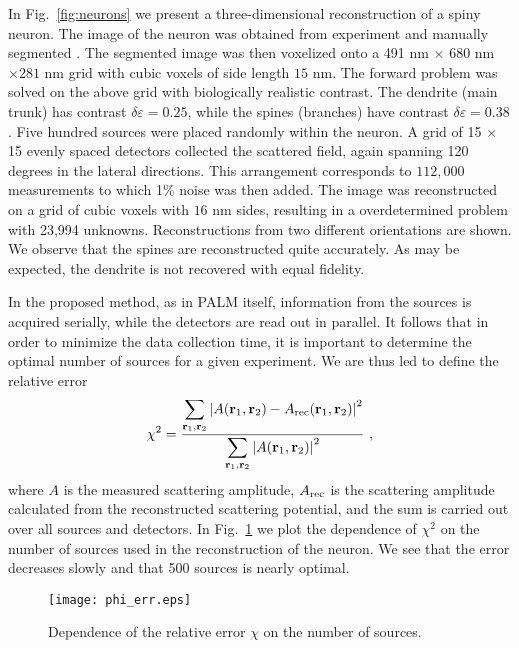 \documentclass[prl,twocolumn]{revtex4-1}
\newcommand{\Br}{{\bf r}}
\begin{document}
In Fig.~\ref{fig:neurons} we present a three-dimensional reconstruction of a spiny neuron. The image of the neuron was obtained from experiment and manually segmented \cite{ccdb,doi:10.1179/his.2000.23.3.261}. The segmented image was then voxelized onto a 491 nm $\times$ 680 nm $\times 281$ nm grid with cubic voxels of side length $15$ nm. The forward problem was solved on the above grid with biologically realistic  contrast.  The dendrite (main trunk) has contrast $\delta\varepsilon=0.25$, while the spines (branches) have contrast $\delta\varepsilon=0.38$.  Five hundred sources were placed randomly within the neuron. A grid of 15 $\times$ 15 evenly spaced detectors collected the scattered field, again spanning 120 degrees in the lateral directions.  This arrangement corresponds to $112,000$  measurements to which 1\% noise was then added. The image was reconstructed on a grid of cubic voxels with $16$ nm sides, resulting in a  overdetermined problem with 23,994 unknowns. Reconstructions from two different orientations are shown. We observe that the spines are reconstructed quite accurately. As may be expected, the dendrite is not recovered with equal fidelity. 

In the proposed method, as in PALM itself, information from the sources is acquired serially, while the detectors are read out in parallel. It follows that in order to minimize the data collection time, it is important to determine the optimal number of sources for a given experiment. We are thus led to define the relative error 
\begin{equation}
\chi^2 = \frac{\displaystyle\sum_{\Br_1,\Br_2}\left|A(\Br_1,\Br_2)-A_{\rm rec}(\Br_1,\Br_2)\right|^2}{\displaystyle\sum_{\Br_1,\Br_2}\left|A(\Br_1,\Br_2)\right|^2} \ ,
\end{equation}
where $A$ is the measured scattering amplitude, $A_{\rm rec}$ is the scattering amplitude calculated from the reconstructed scattering potential, and the sum is carried out over all sources and detectors. In Fig.~\ref{fig:phi_err} we plot the dependence of $\chi^2$ on the number of sources used in the reconstruction of the neuron. We see that the error decreases slowly and that 500 sources is nearly optimal. 

\begin{figure}[b]
\centering
\texttt{[image: phi\_err.eps]}
\caption{\label{fig:phi_err}Dependence of the relative error $\chi$ on the number of sources.}
\end{figure}
\end{document}
